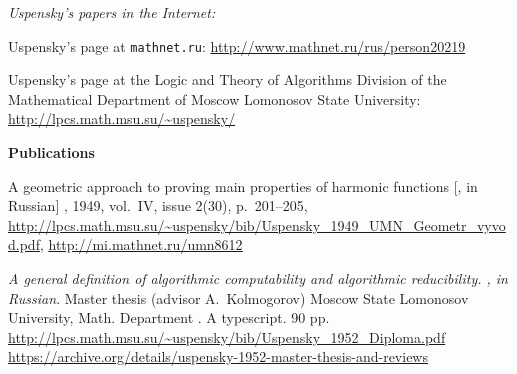\documentclass[12pt]{article}
\theoremstyle{remark}
\newcommand{\bibquote}[1]{}
\newcommand*{\gl}{\nobreak\hskip1pt}
\DeclareRobustCommand*{\dash}{\gl\hbox{-}\gl}
\begin{document}
\clearpage
\raggedright
\begin{thebibliography}{99}

\item[]\hspace{-\labelwidth}\hspace{-\labelsep}\textsl{Uspensky's papers in the Internet:}

Uspensky's page at \texttt{mathnet.ru}: \url{http://www.mathnet.ru/rus/person20219}

Uspensky's page at the Logic and Theory of Algorithms Division of the Mathematical Department of Moscow Lomonosov State University:
\url{http://lpcs.math.msu.su/~uspensky/}

\item[]\hspace{-\labelwidth}\hspace{-\labelsep}\textbf{Publications}

A geometric approach to proving main properties of harmonic functions [, in Russian] \emph{}, 1949, vol.~IV, issue 2(30), p.~201--205,
\url{http://lpcs.math.msu.su/~uspensky/bib/Uspensky_1949_UMN_Geometr_vyvod.pdf},
\url{http://mi.mathnet.ru/umn8612}

\emph{A general definition of algorithmic computability and algorithmic reducibility. , in Russian}. Master thesis (advisor A.~Kolmogorov) Moscow State Lomonosov University, Math. Department  \rus{механико\dash математический факультет}.  A typescript. 90 pp. \url{http://lpcs.math.msu.su/~uspensky/bib/Uspensky_1952_Diploma.pdf}
\url{https://archive.org/details/uspensky-1952-master-thesis-and-reviews}

\bibquote{[Minutes of the Division of History of Mathematics Meeting, May 10, 1952. Participants: A.N.~Kolmogorov, P.S.~Novikov, S.A.~Yanovskaya, I.G.~Bashmakova.  ``After hearing the talks of the student, V.A.~Uspensky, of his thesis advisor, A.N.~Kolmogorov, of the reviewer, P.S.~Novikov, and of S.A.~Yanovskaya, the Division considers the work of V.A.~Uspensky exceptional. It contains several new results and shows a deep understanding of the difficult topic of algorithms theory. The exposition is excellent; the paper should be published.  The Division's head Pr. S.A.~Yanovskaya. May 12, 1952. [\rus{<<Заслушав выступления студента В.\,А.\,Успенского, руководителя работы ак. А.\,Н.\,Колмогорова, рецензента П.\,С.\,Новикова и С.\,А.\,Яновской, кафедра постановила: признать работу В.\,А.\,Успенского выдающейся. Отметить, что работа содержит ряд значительных новых результатов и свидетельствует о глубоком владении автором всей трудной проблематикой теории алгоритмов. Отметить также прекрасное оформление работы и признать необходимым опубликование её. Зав.~кафедрой проф.~C.\,А.\,Яновская, 12 мая 1952 года.>>]} The advisor and reviewer's opinions: \url{http://lpcs.math.msu.su/~uspensky/bib/Uspensky_1952_Diploma_reviews.pdf}, see also \url{https://archive.org/details/uspensky-1952-master-thesis-and-reviews}]}


\end{thebibliography}
\end{document}
